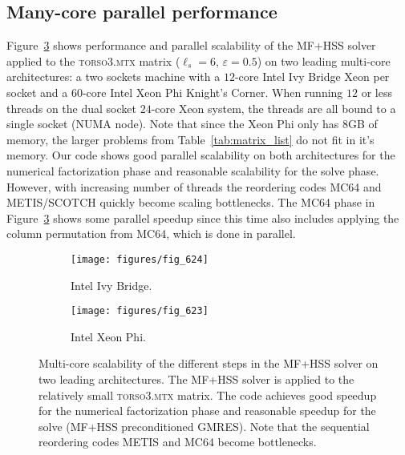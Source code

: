 \documentclass{article}
\newcommand{\tm}{\textsuperscript{\textregistered}}
\begin{document}
\subsection{Many-core parallel performance}
Figure~\ref{fig:scaling_edison_babbage} shows performance and parallel
scalability of the MF+HSS solver applied to the \textsc{torso3.mtx}
matrix ($\ell_s=6$, $\varepsilon=0.5$) on two leading multi-core
architectures: a two sockets machine with a $12$-core Intel\tm{} Ivy
Bridge Xeon per socket and a $60$-core Intel\tm{} Xeon Phi Knight's
Corner. When running $12$ or less threads on the dual socket $24$-core
Xeon system, the threads are all bound to a single socket (NUMA
node). Note that since the Xeon Phi only has $8$GB of memory, the
larger problems from Table~\ref{tab:matrix_list} do not fit in it's
memory. Our code shows good parallel scalability on both architectures
for the numerical factorization phase and reasonable scalability for
the solve phase. However, with increasing number of threads the
reordering codes MC64 and METIS/SCOTCH quickly become scaling
bottlenecks. The MC64 phase in Figure~\ref{fig:scaling_edison_babbage}
shows some parallel speedup since this time also includes applying the
column permutation from MC64, which is done in parallel.
\begin{figure}
  \begin{center}
    \begin{subfigure}{.49\textwidth}
      \texttt{[image: figures/fig\_624]}
      \caption{\footnotesize Intel\tm{} Ivy Bridge.}
      \label{fig:622}
    \end{subfigure}
    \begin{subfigure}{.49\textwidth}
      \texttt{[image: figures/fig\_623]}
      \caption{\footnotesize Intel\tm{} Xeon Phi.}
      \label{fig:623}
    \end{subfigure}
  \end{center}
  \caption{\footnotesize Multi-core scalability of the different steps in the MF+HSS
    solver on two leading architectures. The MF+HSS solver is applied
    to the relatively small \textsc{torso3.mtx} matrix. The code
    achieves good speedup for the numerical factorization phase and
    reasonable speedup for the solve (MF+HSS preconditioned
    GMRES). Note that the sequential reordering codes METIS and MC64
    become bottlenecks.}
  \label{fig:scaling_edison_babbage}
\end{figure}
\end{document}

